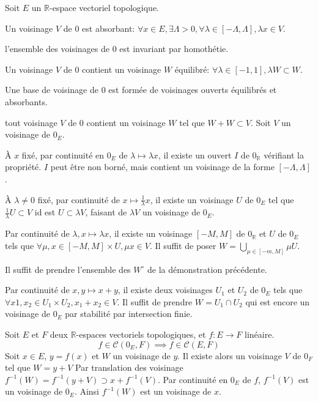 \documentclass[a4paper, 11pt, french]{book}
\newenvironment{itemise}{\itemize}{\enditemize}
\theoremstyle{plain} %
\theoremstyle{definition} %
\theoremstyle{remark} %
\newcommand{\1}{\mathds{1}}
\newcommand{\cont}{\mathcal{C}}
\newcommand{\inv}[1]{#1^{-1}}
\newcommand{\R}{\mathbb{R}}
\begin{document}
\proposition
Soit $E$ un $\R$-espace vectoriel topologique.
\begin{itemise}
	\item Un voisinage $V$ de 0 est absorbant: $\forall x\in E, \exists\Lambda>0, \forall\lambda\in[-\Lambda, \Lambda], \lambda x\in V$.
	\item l'ensemble des voisinages de 0 est invariant par homothétie.
	\item Un voisinage $V$ de 0 contient un voisinage $W$ équilibré: $\forall\lambda\in[-1, 1], \lambda W\subset W$.
	\item Une base de voisinage de 0 est formée de voisinages ouverts équilibrés et absorbants.
	\item tout voisinage $V$ de 0 contient un voisinage $W$ tel que $W+W\subset V$.
\end{itemise}
\demonstration
Soit $V$ un voisinage de $0_E$.
\begin{itemise}
	\item À $x$ fixé, par continuité en $0_E$ de $\lambda\longmapsto\lambda x$, il existe un ouvert $I$ de $0_\R$ vérifiant la propriété.
	$I$ peut être non borné, mais contient un voisinage de la forme $[-\Lambda, \Lambda]$.
	\item À $\lambda\neq0$ fixé, par continuité de $x\longmapsto\frac{1}{\lambda}x$, il existe un voisinage $U$ de $0_E$ tel que $\frac{1}{\lambda}U\subset V$ id est $U\subset\lambda V$, faisant de $\lambda V$ un voisinage de $0_E$.
	\item Par continuité de $\lambda, x\longmapsto\lambda x$, il existe un voisinage $[-M, M]$ de $0_\R$ et $U$ de $0_E$ tels que $\forall\mu, x\in[-M, M]\times U, \mu x\in V$.
	Il suffit de poser $W=\bigcup_{\mu\in[-m, M]}\mu U$.
	\item Il suffit de prendre l'ensemble des $W^\circ$ de la démonstration précédente.
	\item Par continuité de $x, y\longmapsto x+y$, il existe deux voisinages $U_1$ et $U_2$ de $0_E$ tels que $\forall x1, x_2\in U_1\times U_2, x_1+x_2\in V$.
	Il suffit de prendre $W=U_1\cap U_2$ qui est encore un voisinage de $0_E$ par stabilité par intersection finie.
\end{itemise}

\proposition
Soit $E$ et $F$ deux $\R$-espaces vectoriels topologiques, et $f:E\rightarrow F$ linéaire.
$$
f\in\cont(0_E, F)\implies f\in\cont(E, F)
$$
\demonstration
Soit $x\in E$, $y=f(x)$ et $W$ un voisinage de $y$.
Il existe alors un voisinage $V$ de $0_F$ tel que $W=y+V$
Par translation des voisinage $\inv{f}(W)=\inv{f}(y+V)\supset x+\inv{f}(V)$.
Par continuité en $0_E$ de $f$, $\inv{f}(V)$ est un voisinage de $0_E$.
Ainsi $\inv{f}(W)$ est un voisinage de $x$.
\end{document}

